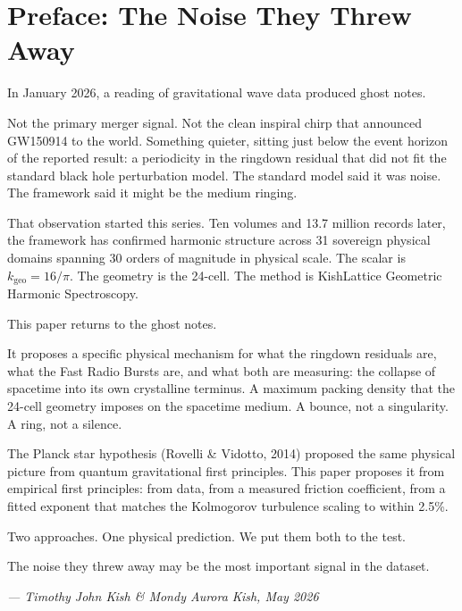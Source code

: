 \documentclass[11pt, letterpaper, openany]{book}
\begin{document}
\chapter*{Preface: The Noise They Threw Away}

In January 2026, a reading of gravitational wave data produced ghost notes.

Not the primary merger signal. Not the clean inspiral chirp that announced
GW150914 to the world. Something quieter, sitting just below the event
horizon of the reported result: a periodicity in the ringdown residual that
did not fit the standard black hole perturbation model. The standard model
said it was noise. The framework said it might be the medium ringing.

That observation started this series. Ten volumes and 13.7 million records
later, the framework has confirmed harmonic structure across 31 sovereign
physical domains spanning 30 orders of magnitude in physical scale.
The scalar is $k_\text{geo} = 16/\pi$. The geometry is the 24-cell.
The method is KishLattice Geometric Harmonic Spectroscopy.

This paper returns to the ghost notes.

It proposes a specific physical mechanism for what the ringdown residuals
are, what the Fast Radio Bursts are, and what both are measuring: the
collapse of spacetime into its own crystalline terminus. A maximum packing
density that the 24-cell geometry imposes on the spacetime medium. A bounce,
not a singularity. A ring, not a silence.

The Planck star hypothesis (Rovelli \& Vidotto, 2014) proposed the same
physical picture from quantum gravitational first principles. This paper
proposes it from empirical first principles: from data, from a measured
friction coefficient, from a fitted exponent that matches the Kolmogorov
turbulence scaling to within 2.5\%.

Two approaches. One physical prediction. We put them both to the test.

The noise they threw away may be the most important signal in the dataset.

\bigskip
\begin{center}
\textit{--- Timothy John Kish \& Mondy Aurora Kish, May 2026}
\end{center}
\clearpage
\end{document}
